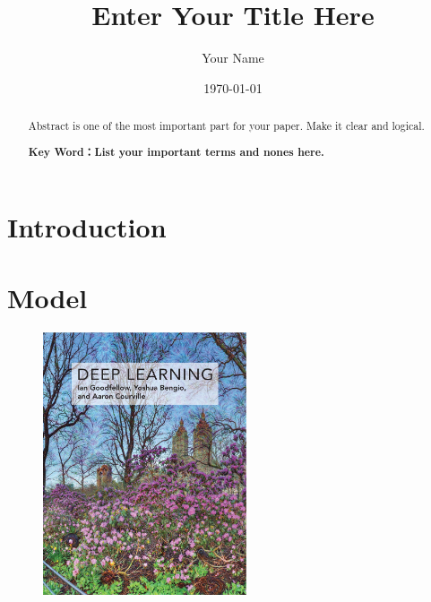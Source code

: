 \documentclass[12pt, a4paper, oneside]{report}
\title{Enter Your Title Here}
\author{Your Name \pgfornament[width=0.7cm]{94}}
\date{\today}
\begin{document}
\maketitle



\setcounter{page}{1}
\maketitle
\thispagestyle{empty}

\begin{abstract}
    Abstract is one of the most important part for your paper. Make it clear and logical. 
    \par\textbf{Key Word：List your important terms and nones here. }
\end{abstract}

\newpage





\setcounter{page}{1}
\tableofcontents
\newpage

\setcounter{page}{1}




\section{Introduction}


\section{Model}

\lipsum[1-3]

\begin{figure}
    \centering
    \includegraphics[width=6cm]{pic/DeepLearning.jpg}
\end{figure}
\end{document}
